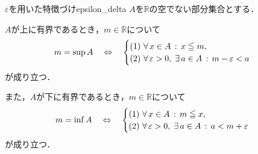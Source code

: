 \begin{theorem}{$\varepsilon$を用いた特徴づけ}{epsilon_delta}
  $A$を$\mathbb{R}$の空でない部分集合とする．

  $A$が上に有界であるとき，$m \in \mathbb{R}$について
  \[
    m = \sup A
    \quad\mathrel{\Leftrightarrow}\quad
    \begin{cases}
      \textup{(1)}\ \forall\, x \in A \,:\, x \leqq m,\\
      \textup{(2)}\ \forall\, \varepsilon > 0 ,\; \exists\, a \in A \,:\, m - \varepsilon < a
    \end{cases}
  \]
  が成り立つ．

  また，$A$が下に有界であるとき，$m \in \mathbb{R}$について
  \[
    m = \inf A
    \quad\mathrel{\Leftrightarrow}\quad
    \begin{cases}
      \textup{(1)}\ \forall\, x \in A \,:\, m \leqq x,\\
      \textup{(2)}\ \forall\, \varepsilon > 0 ,\; \exists\, a \in A \,:\, a < m + \varepsilon
    \end{cases}
  \]
  が成り立つ．
\end{theorem}

